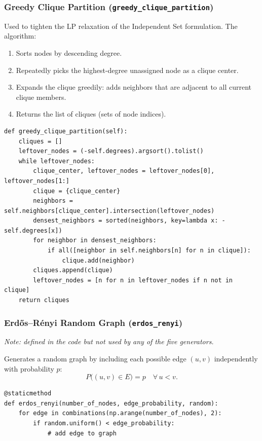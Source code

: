 \subsubsection{Greedy Clique Partition (\texttt{greedy\_clique\_partition})}

Used to tighten the LP relaxation of the Independent Set formulation. The algorithm:

\begin{enumerate}
    \item Sorts nodes by descending degree.
    \item Repeatedly picks the highest-degree unassigned node as a clique center.
    \item Expands the clique greedily: adds neighbors that are adjacent to all current clique members.
    \item Returns the list of cliques (sets of node indices).
\end{enumerate}

\begin{lstlisting}
def greedy_clique_partition(self):
    cliques = []
    leftover_nodes = (-self.degrees).argsort().tolist()
    while leftover_nodes:
        clique_center, leftover_nodes = leftover_nodes[0], leftover_nodes[1:]
        clique = {clique_center}
        neighbors = self.neighbors[clique_center].intersection(leftover_nodes)
        densest_neighbors = sorted(neighbors, key=lambda x: -self.degrees[x])
        for neighbor in densest_neighbors:
            if all([neighbor in self.neighbors[n] for n in clique]):
                clique.add(neighbor)
        cliques.append(clique)
        leftover_nodes = [n for n in leftover_nodes if n not in clique]
    return cliques
\end{lstlisting}

\subsubsection{Erd\H{o}s--R\'enyi Random Graph (\texttt{erdos\_renyi})}

\textit{Note: defined in the code but not used by any of the five generators.}

Generates a random graph by including each possible edge $(u,v)$ independently with probability $p$:
\begin{equation}
    P\bigl((u,v) \in E\bigr) = p \quad \forall\, u < v.
\end{equation}

\begin{lstlisting}
@staticmethod
def erdos_renyi(number_of_nodes, edge_probability, random):
    for edge in combinations(np.arange(number_of_nodes), 2):
        if random.uniform() < edge_probability:
            # add edge to graph
\end{lstlisting}

